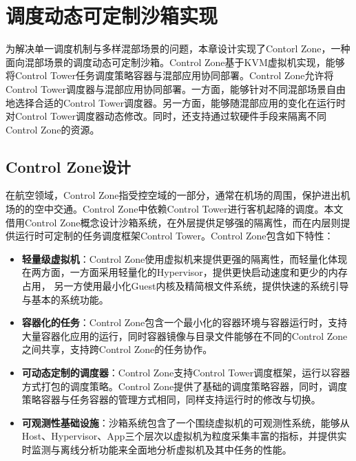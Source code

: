 \chapter{调度动态可定制沙箱实现}\label{chap:control_zone}

为解决单一调度机制与多样混部场景的问题，本章设计实现了Contorl Zone，一种面向混部场景的调度动态可定制沙箱。Control Zone基于KVM虚拟机实现，能够将Control Tower任务调度策略容器与混部应用协同部署。Control Zone允许将Control Tower调度器与混部应用协同部署。一方面，能够针对不同混部场景自由地选择合适的Control Tower调度器。另一方面，能够随混部应用的变化在运行时对Control Tower调度器动态修改。同时，还支持通过软硬件手段来隔离不同Control Zone的资源。

\section{Control Zone设计}



在航空领域，Control Zone指受控空域的一部分，通常在机场的周围，保护进出机场的的空中交通。Control Zone中依赖Control Tower进行客机起降的调度。本文借用Control Zone概念设计沙箱系统，在外层提供足够强的隔离性，而在内层则提供运行时可定制的任务调度框架Control Tower。Control Zone包含如下特性：

\begin{itemize}
    \item \textbf{轻量级虚拟机}：Control Zone使用虚拟机来提供更强的隔离性，而轻量化体现在两方面，一方面采用轻量化的Hypervisor，提供更快启动速度和更少的内存占用， 另一方使用最小化Guest内核及精简根文件系统，提供快速的系统引导与基本的系统功能。
    \item \textbf{容器化的任务}：Control Zone包含一个最小化的容器环境与容器运行时，支持大量容器化应用的运行，同时容器镜像与目录文件能够在不同的Control Zone之间共享，支持跨Control Zone的任务协作。
    \item \textbf{可动态定制的调度器}：Control Zone支持Control Tower调度框架，运行以容器方式打包的调度策略。Control Zone提供了基础的调度策略容器，同时，调度策略容器与任务容器的管理方式相同，同样支持运行时的修改与切换。
    \item \textbf{可观测性基础设施}：沙箱系统包含了一个围绕虚拟机的可观测性系统，能够从Host、Hypervisor、App三个层次以虚拟机为粒度采集丰富的指标，并提供实时监测与离线分析功能来全面地分析虚拟机及其中任务的性能。
\end{itemize}

